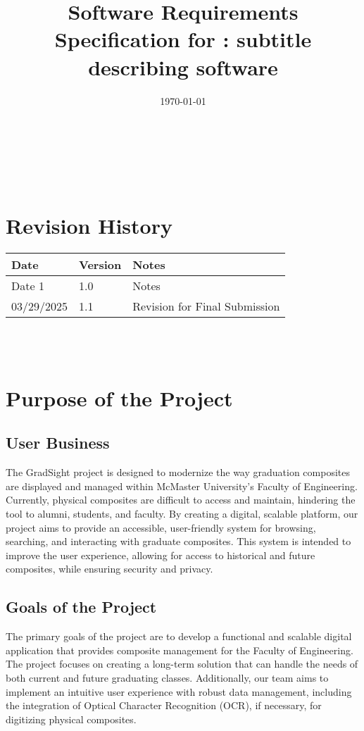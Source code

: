 \documentclass[12pt]{article}
\begin{document}
\title{Software Requirements Specification for \progname: subtitle describing software} 
\author{\authname}
\date{\today}
	
\maketitle

~\newpage


\tableofcontents

~\newpage

\section*{Revision History}

\begin{tabularx}{\textwidth}{p{3cm}p{2cm}X}
\toprule {\textbf{Date}} & {\textbf{Version}} & {\textbf{Notes}}\\
\midrule
Date 1 & 1.0 & Notes\\
03/29/2025 & 1.1 & Revision for Final Submission\\
\bottomrule
\end{tabularx}

~\\

~\newpage
\section{Purpose of the Project}
\subsection{User Business}
The GradSight project is designed to modernize the way graduation composites are displayed and managed within McMaster University's Faculty of Engineering. Currently, physical composites are difficult to access and maintain, hindering the tool to alumni, students, and faculty. By creating a digital, scalable platform, our project aims to provide an accessible, user-friendly system for browsing, searching, and interacting with graduate composites. This system is intended to improve the user experience, allowing for access to historical and future composites, while ensuring security and privacy.

\subsection{Goals of the Project}
The primary goals of the project are to develop a functional and scalable digital application that provides composite management for the Faculty of Engineering. The project focuses on creating a long-term solution that can handle the needs of both current and future graduating classes. Additionally, our team aims to implement an intuitive user experience with robust data management, including the integration of Optical Character Recognition (OCR), if necessary, for digitizing physical composites.
\end{document}
